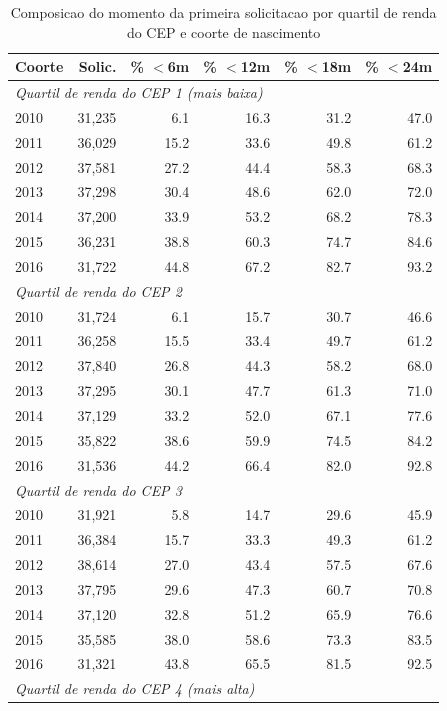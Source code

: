 \begin{table}[htbp]\centering
\caption{Composicao do momento da primeira solicitacao por quartil de renda do CEP e coorte de nascimento}
\label{tab:S7b}
\small
\begin{tabular}{lrrrrr}
\toprule
Coorte & Solic. & \% $<$6m & \% $<$12m & \% $<$18m & \% $<$24m \\
\midrule
\multicolumn{6}{l}{\textit{Quartil de renda do CEP 1 (mais baixa)}}}} \\
2010 & 31,235 & 6.1 & 16.3 & 31.2 & 47.0 \\
2011 & 36,029 & 15.2 & 33.6 & 49.8 & 61.2 \\
2012 & 37,581 & 27.2 & 44.4 & 58.3 & 68.3 \\
2013 & 37,298 & 30.4 & 48.6 & 62.0 & 72.0 \\
2014 & 37,200 & 33.9 & 53.2 & 68.2 & 78.3 \\
2015 & 36,231 & 38.8 & 60.3 & 74.7 & 84.6 \\
2016 & 31,722 & 44.8 & 67.2 & 82.7 & 93.2 \\
\midrule
\multicolumn{6}{l}{\textit{Quartil de renda do CEP 2}}}} \\
2010 & 31,724 & 6.1 & 15.7 & 30.7 & 46.6 \\
2011 & 36,258 & 15.5 & 33.4 & 49.7 & 61.2 \\
2012 & 37,840 & 26.8 & 44.3 & 58.2 & 68.0 \\
2013 & 37,295 & 30.1 & 47.7 & 61.3 & 71.0 \\
2014 & 37,129 & 33.2 & 52.0 & 67.1 & 77.6 \\
2015 & 35,822 & 38.6 & 59.9 & 74.5 & 84.2 \\
2016 & 31,536 & 44.2 & 66.4 & 82.0 & 92.8 \\
\midrule
\multicolumn{6}{l}{\textit{Quartil de renda do CEP 3}}}} \\
2010 & 31,921 & 5.8 & 14.7 & 29.6 & 45.9 \\
2011 & 36,384 & 15.7 & 33.3 & 49.3 & 61.2 \\
2012 & 38,614 & 27.0 & 43.4 & 57.5 & 67.6 \\
2013 & 37,795 & 29.6 & 47.3 & 60.7 & 70.8 \\
2014 & 37,120 & 32.8 & 51.2 & 65.9 & 76.6 \\
2015 & 35,585 & 38.0 & 58.6 & 73.3 & 83.5 \\
2016 & 31,321 & 43.8 & 65.5 & 81.5 & 92.5 \\
\midrule
\multicolumn{6}{l}{\textit{Quartil de renda do CEP 4 (mais alta)}}}} \\

\end{tabular}
\end{table}
